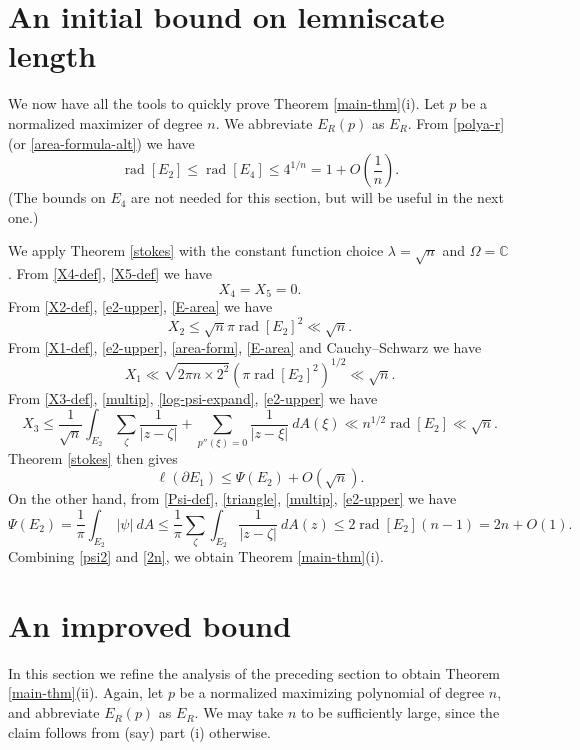 \documentclass[12pt]{amsart}
\newcommand{\C}{\mathbb{C}}
\renewcommand{\r}{\operatorname{rad}}
\begin{document}
\section{An initial bound on lemniscate length}\label{main-i-sec}

We now have all the tools to quickly prove Theorem \ref{main-thm}(i).  Let $p$ be a normalized maximizer of degree $n$.  We abbreviate $E_R(p)$ as $E_R$. From \eqref{polya-r} (or \eqref{area-formula-alt}) we have
\begin{equation}\label{e2-upper}
    \r[E_2] \leq \r[E_4] \leq 4^{1/n} = 1 + O\left( \frac{1}{n} \right).
\end{equation}
(The bounds on $E_4$ are not needed for this section, but will be useful in the next one.)

We apply Theorem \ref{stokes} with the constant function choice $\lambda = \sqrt{n}$ and $\Omega = \C$.  From \eqref{X4-def}, \eqref{X5-def} we have
$$ X_4 = X_5 = 0.$$
From \eqref{X2-def}, \eqref{e2-upper}, \eqref{E-area} we have
$$ X_2 \leq \sqrt{n} \pi \r[E_2]^2 \ll \sqrt{n}.$$
From \eqref{X1-def}, \eqref{e2-upper}, \eqref{area-form}, \eqref{E-area} and Cauchy--Schwarz we have
$$ X_1 \ll \sqrt{2\pi n \times 2^2} (\pi \r[E_2]^2)^{1/2} \ll \sqrt{n}.$$
From \eqref{X3-def}, \eqref{multip}, \eqref{log-psi-expand}, \eqref{e2-upper} we have
$$ X_3 \leq \frac{1}{\sqrt{n}} \int_{E_2} \sum_\zeta \frac{1}{|z-\zeta|} + \sum_{p''(\xi)=0} \frac{1}{|z-\xi|}\ dA(\xi) \ll n^{1/2} \r[E_2] \ll \sqrt{n}.$$
Theorem \ref{stokes} then gives
\begin{equation}\label{psi2}
\ell(\partial E_1) \leq \Psi(E_2) + O(\sqrt{n}).
\end{equation}
On the other hand, from \eqref{Psi-def}, \eqref{triangle}, \eqref{multip}, \eqref{e2-upper} we have
\begin{equation}\label{2n}
\Psi(E_2)= \frac{1}{\pi} \int_{E_2} |\psi|\ d A \leq
 \frac{1}{\pi} \sum_\zeta \int_{E_2} \frac{1}{|z-\zeta|}\ d A(z) \leq
 2 \r[E_2] (n-1) = 2n + O(1).
\end{equation}
Combining \eqref{psi2} and \eqref{2n}, we obtain Theorem \ref{main-thm}(i).

\section{An improved bound}\label{main-ii-sec}

In this section we refine the analysis of the preceding section to obtain Theorem \ref{main-thm}(ii).  Again, let $p$ be a normalized maximizing polynomial of degree $n$, and abbreviate $E_R(p)$ as $E_R$.  We may take $n$ to be sufficiently large, since the claim follows from (say) part (i) otherwise.
\end{document}
